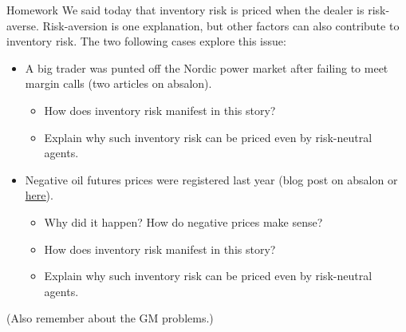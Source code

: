 \documentclass[english,10pt
,aspectratio=169
]{beamer}
\begin{document}
\begin{frame}{Homework}
	We said today that inventory risk is priced when the dealer is risk-averse. Risk-aversion is one explanation, but other factors can also contribute to inventory risk.
	The two following cases explore this issue:
	\begin{itemize}
		\item A big trader was punted off the Nordic power market after failing to meet margin calls (two articles on absalon).
		\begin{itemize}
			\item How does inventory risk manifest in this story?
			\item Explain why such inventory risk can be priced even by risk-neutral agents.
		\end{itemize}
		\item Negative oil futures prices were registered last year (blog post on absalon or \href{https://streetwiseprofessor.com/wti-wtf/}{\uline{here}}).
		\begin{itemize}
			\item Why did it happen? How do negative prices make sense?
			\item How does inventory risk manifest in this story?
			\item Explain why such inventory risk can be priced even by risk-neutral agents.
		\end{itemize}
	\end{itemize}
	
	(Also remember about the GM problems.)

\end{frame}
\end{document}
